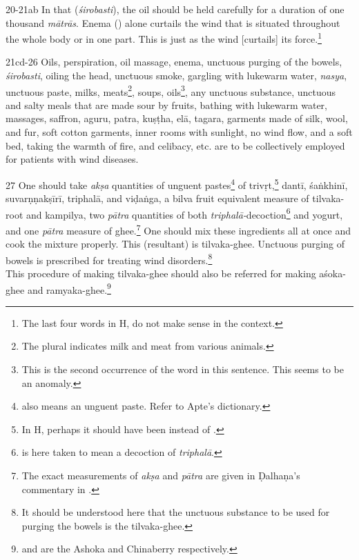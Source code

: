 \begin{translation}
\begin{tt}
    \item[20-21ab]
    In that (\textit{śirobasti}), the oil should be held carefully for a duration of 
    one thousand \textit{mātrās}. Enema () alone curtails the wind 
    that is situated throughout the whole body or in one part. This is just as the 
    wind [curtails] its force.\footnote{The last four words in H,  do not make sense in the context.} 

    \item[21cd-26]
    Oils, perspiration, oil massage, enema, unctuous purging of the bowels, 
    \textit{śirobasti}, oiling the head, unctuous smoke, gargling with lukewarm 
    water, \textit{nasya}, unctuous paste, milks, 
    meats\footnote{The plural indicates milk and meat from various animals.}, 
    soups, oils\footnote{This is the second occurrence of the word 
     in this sentence. This seems to be an anomaly.}, any 
    unctuous substance, unctuous and salty meals that are made sour by fruits, 
    bathing with lukewarm water, massages, saffron, \gls{aguru}, \gls{patra}, 
    \gls{kuṣṭha}, \gls{elā}, \gls{tagara}, garments made of silk, wool, and fur, 
    soft cotton garments, inner rooms with sunlight, no wind flow, and a soft 
    bed, taking the warmth of fire, and celibacy, etc. are to be collectively 
    employed for patients with wind diseases.    

    \item[27]
    One should take \textit{akṣa} quantities of unguent 
    pastes\footnote{ also means an unguent paste. Refer to Apte's 
    dictionary.} of \gls{trivṛt},\footnote{In H, perhaps it should have been 
     instead of .} \gls{dantī}, \gls{śaṅkhinī}, 
    \gls{suvarṇṇakṣīrī}, \gls{triphalā}, and \gls{viḍaṅga}, a \gls{bilva} fruit 
    equivalent measure of \gls{tilvaka}-root and \gls{kampilya}, two 
    \textit{pātra} quantities of both 
    \textit{triphalā-}decoction\footnote{ is here taken to 
    mean 
    a decoction of \textit{triphalā}.} and yogurt, and one \textit{pātra} 
    measure 
    of ghee.\footnote{The exact measurements of \textit{akṣa} and 
    \textit{pātra} 
    are given in Ḍalhaṇa's commentary in \cite[422]{vulgate}.} One should mix 
    these ingredients all at once and cook the mixture properly. This (resultant) 
    is 
    \gls{tilvaka}-ghee. Unctuous purging of bowels is prescribed for treating 
    wind 
    disorders.\footnote{It should be understood here that the unctuous 
    substance 
    to be used for purging the bowels is the \gls{tilvaka}-ghee.}\\
    This procedure of making \gls{tilvaka}-ghee should also be referred for 
    making \gls{aśoka}-ghee and \gls{ramyaka}-ghee.\footnote{ 
    and  are the Ashoka and Chinaberry respectively.}


\end{tt}
\end{translation}
